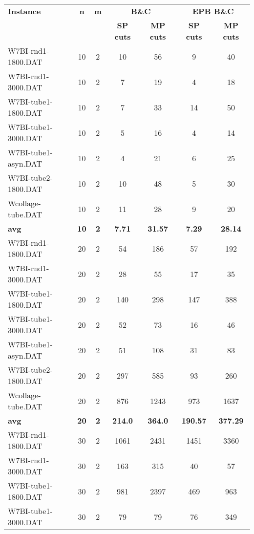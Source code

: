 \begin{table}[!ht]
\centering
\hspace*{-1cm}\begin{tabular}{lcccccc}
\toprule
\textbf{Instance} & \textbf{n} & \textbf{m} & \multicolumn{2}{c}{\textbf{B\&C}}  & \multicolumn{2}{c}{\textbf{EPB B\&C}}
\\
\cmidrule(r){4-5} \cmidrule(r){6-7} 
~ & ~ & ~ & \textbf{SP cuts} &\textbf{MP cuts} & \textbf{SP cuts} &\textbf{MP cuts} \\
\midrule

W7BI-rnd1-1800.DAT & 10 & 2 & 10 & 56 & 9 & 40 \\
W7BI-rnd1-3000.DAT & 10 & 2 & 7 & 19 & 4 & 18 \\
W7BI-tube1-1800.DAT & 10 & 2 & 7 & 33 & 14 & 50 \\
W7BI-tube1-3000.DAT & 10 & 2 & 5 & 16 & 4 & 14 \\
W7BI-tube1-asyn.DAT & 10 & 2 & 4 & 21 & 6 & 25 \\
W7BI-tube2-1800.DAT & 10 & 2 & 10 & 48 & 5 & 30 \\
Wcollage-tube.DAT & 10 & 2 & 11 & 28 & 9 & 20 \\
\cline{1-7} \textbf{avg} & \textbf{10} & \textbf{2} & \textbf{7.71} & \textbf{31.57} & \textbf{7.29} & \textbf{28.14} \\ \cline{1-7}
W7BI-rnd1-1800.DAT & 20 & 2 & 54 & 186 & 57 & 192 \\
W7BI-rnd1-3000.DAT & 20 & 2 & 28 & 55 & 17 & 35 \\
W7BI-tube1-1800.DAT & 20 & 2 & 140 & 298 & 147 & 388 \\
W7BI-tube1-3000.DAT & 20 & 2 & 52 & 73 & 16 & 46 \\
W7BI-tube1-asyn.DAT & 20 & 2 & 51 & 108 & 31 & 83 \\
W7BI-tube2-1800.DAT & 20 & 2 & 297 & 585 & 93 & 260 \\
Wcollage-tube.DAT & 20 & 2 & 876 & 1243 & 973 & 1637 \\
\cline{1-7} \textbf{avg} & \textbf{20} & \textbf{2} & \textbf{214.0} & \textbf{364.0} & \textbf{190.57} & \textbf{377.29} \\ \cline{1-7}
W7BI-rnd1-1800.DAT & 30 & 2 & 1061 & 2431 & 1451 & 3360 \\
W7BI-rnd1-3000.DAT & 30 & 2 & 163 & 315 & 40 & 57 \\
W7BI-tube1-1800.DAT & 30 & 2 & 981 & 2397 & 469 & 963 \\
W7BI-tube1-3000.DAT & 30 & 2 & 79 & 79 & 76 & 349 \\

\end{tabular}
\end{table}

